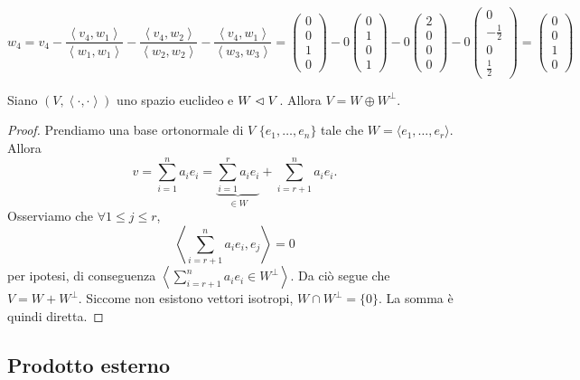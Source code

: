 \documentclass{article}     %
\newcommand{\scp}[1][\cdot,\cdot]{\left\langle #1 \right\rangle}
\begin{document}
\begin{ex}
    \[w_4=v_4-\frac{\scp[v_4,w_1]}{\scp[w_1,w_1]}-\frac{\scp[v_4,w_2]}{\scp[w_2,w_2]}-\frac{\scp[v_4,w_1]}{\scp[w_3,w_3]}= \begin{pmatrix}
        0\\0\\1\\0
    \end{pmatrix}-0\begin{pmatrix}
        0\\1\\0\\1
    \end{pmatrix}-0\begin{pmatrix}
        2\\0\\0\\0
    \end{pmatrix}-0\begin{pmatrix}
        0\\-\textstyle\frac{1}{2}\\0\\\textstyle\frac{1}{2}
    \end{pmatrix}=\begin{pmatrix}
        0\\0\\1\\0
    \end{pmatrix}\]
\end{ex}

\begin{prop}
    Siano $(V,\scp)$ uno spazio euclideo e $W\vartriangleleft V$. Allora $V=W\oplus W^\perp$.
\end{prop}
\begin{proof}
    Prendiamo una base ortonormale di $V$ $\{e_1, \dots, e_n\}$ tale che $W=\langle e_1,\dots, e_r\rangle$. Allora 
    \[v=\sum_{i=1}^na_ie_i=\underbrace{\sum_{i=1}^ra_ie_i}_{\in W}+\sum_{i=r+1}^na_ie_i.\]
    Osserviamo che $\forall 1\leq j\leq r$, 
    \[\scp[\sum_{i=r+1}^na_ie_i, e_j]=0\]
    per ipotesi, di conseguenza $\scp[\sum_{i=r+1}^na_ie_i\in W^\perp]$. Da ciò segue che $V=W+W^\perp$. Siccome non esistono vettori isotropi, $W \cap W^\perp=\{0\}$. La somma è quindi diretta.
\end{proof}

\subsection{Prodotto esterno}
\end{document}
